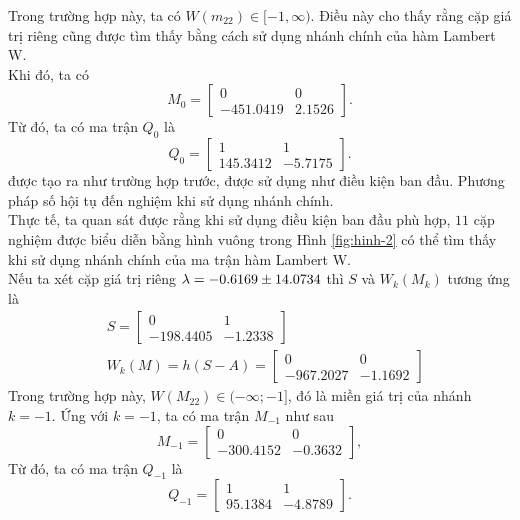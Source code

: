 Trong trường hợp này, ta có $W(m_{22}) \in [-1, \infty)$. Điều này cho thấy rằng cặp giá trị riêng cũng được tìm thấy bằng cách sử dụng nhánh chính của hàm Lambert W. \\
Khi đó, ta có 
\begin{equation*}
	M_0= \begin{bmatrix}
		0&0\\ -451.0419 &2.1526
	\end{bmatrix}.
\end{equation*}
Từ đó, ta có ma trận $Q_0$ là
\begin{equation}\label{eq39}
	Q_0= \begin{bmatrix}
		1&1\\ 145.3412 &-5.7175
	\end{bmatrix}.
\end{equation}
được tạo ra như trường hợp trước, được sử dụng như điều kiện ban đầu. Phương pháp số hội tụ đến nghiệm khi sử dụng nhánh chính.\\
Thực tế, ta quan sát được rằng khi sử dụng điều kiện ban đầu phù hợp, $11$ cặp nghiệm được biểu diễn bằng hình vuông trong Hình \ref{fig:hinh-2} có thể tìm thấy khi sử dụng nhánh chính của ma trận hàm Lambert W.\\
Nếu ta xét cặp giá trị riêng $\lambda = -0.6169 \pm 14.0734$ thì $S$ và $W_k(M_k)$ tương ứng là
\begin{align}\label{eq40}
	&S=\begin{bmatrix}
		0 & 1 \\ -198.4405 & -1.2338
	\end{bmatrix}
	\\ 
	& W_k(M)= h  (S -A)=\begin{bmatrix}
		0 & 0 \\ -967.2027 & -1.1692
	\end{bmatrix}
\end{align} 
Trong trường hợp này, $W(M_{22}) \in (-\infty; -1]$, đó là miền giá trị của nhánh $k = -1$. Ứng với $k = -1$, ta có ma trận $M_{-1}$ như sau
\begin{equation*}
	M_{-1}= \begin{bmatrix}
		0 & 0 \\   -300.4152  &-0.3632
	\end{bmatrix},
\end{equation*}
Từ đó, ta có ma trận $Q_{-1}$ là
\begin{equation}\label{eq41}
	Q_{-1}	= \begin{bmatrix}
		1&1\\95.1384 & -4.8789
	\end{bmatrix}.
\end{equation}
